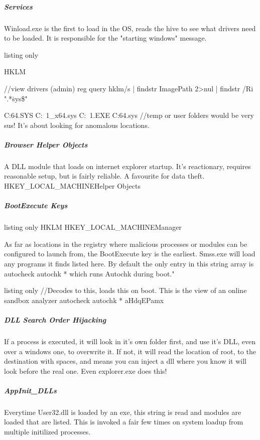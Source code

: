 \subparagraph{Services}
Winload.exe is the first to load in the OS, reads the hive to see what drivers need to be loaded. It is responsible for the "starting windows" message.
\begin{tcblisting}{listing only}

HKLM\SYSTEM\CurrentControlSet\Services

//view drivers (admin)
reg query hklm\system\currentcontrolset\services /s | findstr ImagePath 2>nul | findstr /Ri ".*\.sys\$"

C:\WINDOWS\TEMP\INSTB64.SYS C:\Users\USERNA~1\AppData\Local\Temp{}_x64.sys C:\Windows\TEMP{}~1.EXE C:\Users\username\AppData\Local\Temp\ALSysIO64.sys
//temp or user folders would be very sus! It's about looking for anomalous locations.



\subparagraph{Browser Helper Objects}
A DLL module that loads on internet explorer startup. It's reactionary, requires reasonable setup, but is fairly reliable. A favourite for data theft.
HKEY_LOCAL_MACHINE\SOFTWARE\Microsoft\Windows\CurrentVersion\Explorer\Browser Helper Objects
\end{tcblisting}

\subparagraph{BootExecute Keys}
\begin{tcblisting}{listing only}
HKLM\SYSTEM\CurrentControlSet\Control\hivelist
HKEY_LOCAL_MACHINE\SYSTEM{}\Control\Session Manager
\end{tcblisting}

As far as locations in the registry where malicious processes or modules can be configured to launch from, the BootExecute key is the earliest. Smss.exe will load any programs it finds listed here. By default the only entry in this string array is autocheck autochk * which runs Autochk during boot."

\begin{tcblisting}{listing only}
//Decodes to this, loads this on boot. This is the view of an online sandbox analyzer
autocheck autochk * aHdqEPamx
\end{tcblisting}


\subparagraph{DLL Search Order Hijacking}
If a process is executed, it will look in it's own folder first, and use it's DLL, even over a windows one, to overwrite it. If not, it will read the location of root, 
to the destination with spaces, and means you can inject a dll where you know it will look before the real one. Even explorer.exe does this!

\subparagraph{AppInit_DLLs}
Everytime User32.dll is loaded by an exe, this string is read and modules are loaded that are listed. This is invoked a fair few times on system loadup from multiple initilized processes.


